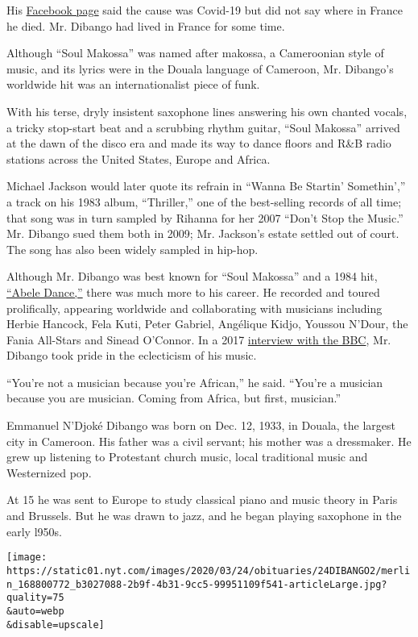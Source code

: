 His \href{https://www.facebook.com/ManuDibangoOfficiel}{Facebook page}
said the cause was Covid-19 but did not say where in France he died. Mr.
Dibango had lived in France for some time.

Although ``Soul Makossa'' was named after makossa, a Cameroonian style
of music, and its lyrics were in the Douala language of Cameroon, Mr.
Dibango's worldwide hit was an internationalist piece of funk.

With his terse, dryly insistent saxophone lines answering his own
chanted vocals, a tricky stop-start beat and a scrubbing rhythm guitar,
``Soul Makossa'' arrived at the dawn of the disco era and made its way
to dance floors and R\&B radio stations across the United States, Europe
and Africa.

Michael Jackson would later quote its refrain in ``Wanna Be Startin'
Somethin','' a track on his 1983 album, ``Thriller,'' one of the
best-selling records of all time; that song was in turn sampled by
Rihanna for her 2007 ``Don't Stop the Music.'' Mr. Dibango sued them
both in 2009; Mr. Jackson's estate settled out of court. The song has
also been widely sampled in hip-hop.

Although Mr. Dibango was best known for ``Soul Makossa'' and a 1984 hit,
\href{https://www.youtube.com/watch?v=Ph5GB8RArks}{``Abele Dance,''}
there was much more to his career. He recorded and toured prolifically,
appearing worldwide and collaborating with musicians including Herbie
Hancock, Fela Kuti, Peter Gabriel, Angélique Kidjo, Youssou N'Dour, the
Fania All-Stars and Sinead O'Connor. In a 2017
\href{https://www.bbc.com/news/world-europe-52017834}{interview with the
BBC}, Mr. Dibango took pride in the eclecticism of his music.

``You're not a musician because you're African,'' he said. ``You're a
musician because you are musician. Coming from Africa, but first,
musician.''

Emmanuel N'Djoké Dibango was born on Dec. 12, 1933, in Douala, the
largest city in Cameroon. His father was a civil servant; his mother was
a dressmaker. He grew up listening to Protestant church music, local
traditional music and Westernized pop.

At 15 he was sent to Europe to study classical piano and music theory in
Paris and Brussels. But he was drawn to jazz, and he began playing
saxophone in the early l950s.

\texttt{[image: https://static01.nyt.com/images/2020/03/24/obituaries/24DIBANGO2/merlin\_168800772\_b3027088-2b9f-4b31-9cc5-99951109f541-articleLarge.jpg?quality=75\\\&auto=webp\\\&disable=upscale]}

